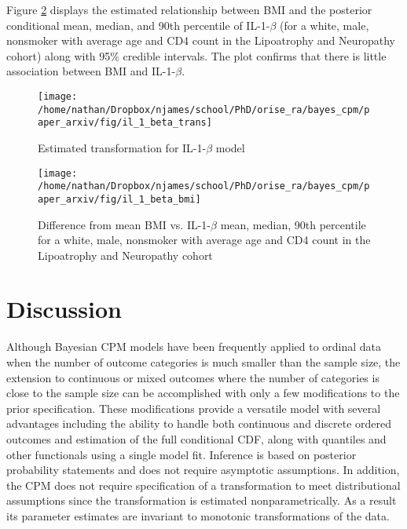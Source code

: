 \documentclass[
]{article}
\begin{document}
Figure \ref{fig:il-1-beta-bmi} displays the estimated relationship between BMI and the posterior conditional mean, median, and 90th percentile of IL-1-\(\beta\) (for a white, male, nonsmoker with average age and CD4 count in the Lipoatrophy and Neuropathy cohort) along with 95\% credible intervals. The plot confirms that there is little association between BMI and IL-1-\(\beta\).

\begin{figure}

{\centering \texttt{[image: /home/nathan/Dropbox/njames/school/PhD/orise\_ra/bayes\_cpm/paper\_arxiv/fig/il\_1\_beta\_trans]} 

}

\caption{Estimated transformation for IL-1-$\beta$ model}\label{fig:il-1-beta-trans}
\end{figure}

\begin{figure}

{\centering \texttt{[image: /home/nathan/Dropbox/njames/school/PhD/orise\_ra/bayes\_cpm/paper\_arxiv/fig/il\_1\_beta\_bmi]} 

}

\caption{Difference from mean BMI vs. IL-1-$\beta$ mean, median, 90th percentile for a white, male, nonsmoker with average age and CD4 count in the Lipoatrophy and Neuropathy cohort}\label{fig:il-1-beta-bmi}
\end{figure}

\hypertarget{discussion}{%
\section{Discussion}\label{discussion}}

Although Bayesian CPM models have been frequently applied to ordinal data when the number of outcome categories is much smaller than the sample size, the extension to continuous or mixed outcomes where the number of categories is close to the sample size can be accomplished with only a few modifications to the prior specification. These modifications provide a versatile model with several advantages including the ability to handle both continuous and discrete ordered outcomes and estimation of the full conditional CDF, along with quantiles and other functionals using a single model fit. Inference is based on posterior probability statements and does not require asymptotic assumptions. In addition, the CPM does not require specification of a transformation to meet distributional assumptions since the transformation is estimated nonparametrically. As a result its parameter estimates are invariant to monotonic transformations of the data.
\end{document}
